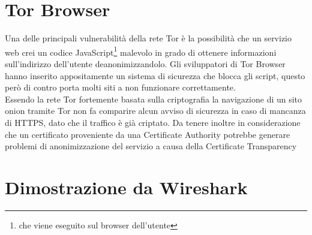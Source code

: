 \section{Tor Browser}
Una delle principali vulnerabilità della rete Tor è la possibilità che un servizio web crei un codice JavaScript\footnote{che viene eseguito sul browser dell'utente} malevolo in grado di ottenere informazioni sull'indirizzo dell'utente deanonimizzandolo. 
Gli sviluppatori di Tor Browser hanno inserito appositamente un sistema di sicurezza che blocca gli script, questo però di contro porta molti siti a non funzionare correttamente. \\
Essendo la rete Tor fortemente basata sulla criptografia la navigazione di un sito onion tramite Tor non fa comparire alcun avviso di sicurezza in caso di mancanza di HTTPS, dato che il traffico è già criptato. 
Da tenere inoltre in considerazione che un certificato proveniente da una Certificate Authority potrebbe generare problemi di anonimizzazione del servizio a causa della Certificate Transparency\cite{CertificateTransparency} \\
\newpage
\section{Dimostrazione da Wireshark}

